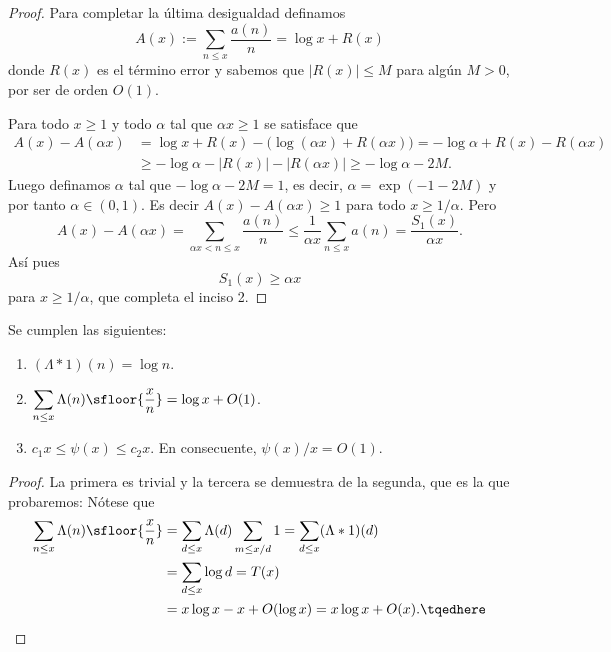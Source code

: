 \documentclass[teoria-numeros.tex]{subfiles}
\begin{document}
\begin{proof}
	Para completar la última desigualdad definamos
	$$ A(x) := \sum_{n\le x} \frac{a(n)}{n} = \log x + R(x) $$
	donde $R(x)$ es el término error y sabemos que $|R(x)| \le M$ para algún $M > 0$, por ser de orden $O(1)$.

	Para todo $x\ge 1$ y todo $\alpha$ tal que $\alpha x\ge 1$ se satisface que
	\begin{align*}
		A(x) - A(\alpha x) &= \log x + R(x) - \big( \log(\alpha x) + R(\alpha x) \big) = -\log\alpha + R(x) - R(\alpha x) \\
		&\ge -\log\alpha - |R(x)| - |R(\alpha x)| \ge -\log\alpha - 2M.
	\end{align*}
	Luego definamos $\alpha$ tal que $-\log\alpha - 2M = 1$, es decir, $\alpha = \exp(-1 - 2M)$ y por tanto $\alpha \in (0, 1)$.
	Es decir $A(x) - A(\alpha x) \ge 1$ para todo $x\ge 1/\alpha$.
	Pero
	$$ A(x) - A(\alpha x) = \sum_{\alpha x < n\le x} \frac{a(n)}{n} \le \frac{1}{\alpha x}\sum_{n\le x} a(n) = \frac{S_1(x)}{\alpha x}. $$
	Así pues
	$$ S_1(x) \ge \alpha x $$
	para $x\ge 1/\alpha$, que completa el inciso 2.
\end{proof}

\begin{cor}
	Se cumplen las siguientes:
	\begin{enumerate}
		\item $ (\Lambda * 1)(n) = \log n $.
		\item $\displaystyle \sum_{n\le x} \Lambda(n)\sfloor{ \frac{x}{n} } = \log x + O(1) $.
		\item $ c_1x \le \psi(x) \le c_2 x $.
			En consecuente, $\psi(x)/x = O(1)$.
	\end{enumerate}
\end{cor}
\begin{proof}
	La primera es trivial y la tercera se demuestra de la segunda, que es la que probaremos:
	Nótese que
	\begin{align}
		\sum_{n\le x} \Lambda(n)\sfloor{ \frac{x}{n} } &= \sum_{d\le x} \Lambda(d) \sum_{m \le x/d} 1 = \sum_{d\le x} (\Lambda * 1)(d) \notag \\
		&= \sum_{d\le x} \log d = T(x) \label{eq:lambda_sum_T} \\
		&= x\log x - x + O(\log x) = x\log x + O(x). \tqedhere
	\end{align}
\end{proof}
\end{document}
